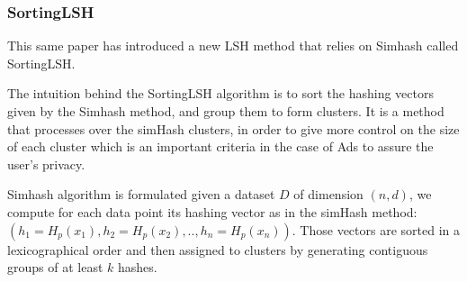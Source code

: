 \subsubsection{SortingLSH}
This same paper \citep{google_floc_2020} has introduced a new LSH method that
relies on Simhash called SortingLSH.

The intuition behind the SortingLSH algorithm is to sort the hashing vectors
given by the Simhash method, and group them to form clusters. It is a method
that processes over the simHash clusters, in order to give more control on the
size of each cluster which is an important criteria in the case of Ads to
assure the user's privacy.

Simhash algorithm is formulated given a dataset $D$ of dimension $(n, d)$, we
compute for each data point its hashing vector as in the simHash method:
$(h_1=H_p (x_1) , h_2=H_p (x_2) ,.., h_n=H_p (x_n))$. Those vectors are sorted
in a \gls{lexicographical} order and then assigned to clusters by generating
contiguous groups of at least $k$ hashes.
